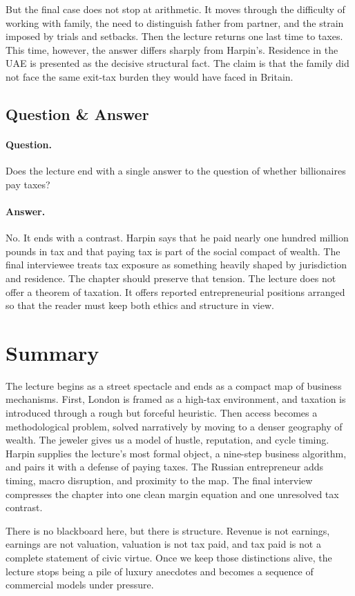 But the final case does not stop at arithmetic. It moves through the difficulty of working with family, the need to distinguish father from partner, and the strain imposed by trials and setbacks. Then the lecture returns one last time to taxes. This time, however, the answer differs sharply from Harpin's. Residence in the UAE is presented as the decisive structural fact. The claim is that the family did not face the same exit-tax burden they would have faced in Britain.

\subsection{Question \& Answer}

\paragraph{Question.} Does the lecture end with a single answer to the question of whether billionaires pay taxes?

\paragraph{Answer.} No. It ends with a contrast. Harpin says that he paid nearly one hundred million pounds in tax and that paying tax is part of the social compact of wealth. The final interviewee treats tax exposure as something heavily shaped by jurisdiction and residence. The chapter should preserve that tension. The lecture does not offer a theorem of taxation. It offers reported entrepreneurial positions arranged so that the reader must keep both ethics and structure in view.

\section{Summary}

The lecture begins as a street spectacle and ends as a compact map of business mechanisms. First, London is framed as a high-tax environment, and taxation is introduced through a rough but forceful heuristic. Then access becomes a methodological problem, solved narratively by moving to a denser geography of wealth. The jeweler gives us a model of hustle, reputation, and cycle timing. Harpin supplies the lecture's most formal object, a nine-step business algorithm, and pairs it with a defense of paying taxes. The Russian entrepreneur adds timing, macro disruption, and proximity to the map. The final interview compresses the chapter into one clean margin equation and one unresolved tax contrast.

There is no blackboard here, but there is structure. Revenue is not earnings, earnings are not valuation, valuation is not tax paid, and tax paid is not a complete statement of civic virtue. Once we keep those distinctions alive, the lecture stops being a pile of luxury anecdotes and becomes a sequence of commercial models under pressure.